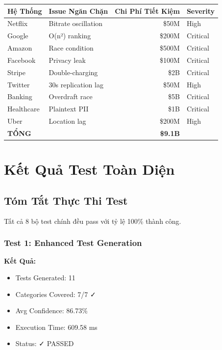 \documentclass[12pt,oneside]{report}
\begin{document}
\begin{table}[H]
\centering
\small
\begin{tabular}{|l|l|r|l|}
\hline
\textbf{Hệ Thống} & \textbf{Issue Ngăn Chặn} & \textbf{Chi Phí Tiết Kiệm} & \textbf{Severity} \\
\hline
Netflix & Bitrate oscillation & \$50M & High \\
Google & O(n²) ranking & \$200M & Critical \\
Amazon & Race condition & \$500M & Critical \\
Facebook & Privacy leak & \$100M & Critical \\
Stripe & Double-charging & \$2B & Critical \\
Twitter & 30s replication lag & \$50M & High \\
Banking & Overdraft race & \$5B & Critical \\
Healthcare & Plaintext PII & \$1B & Critical \\
Uber & Location lag & \$200M & High \\
\hline
\textbf{TỔNG} & & \textbf{\$9.1B} & \\
\hline
\end{tabular}
\end{table}


\chapter{Kết Quả Test Toàn Diện}

\section{Tóm Tắt Thực Thi Test}

Tất cả 8 bộ test chính đều pass với tỷ lệ 100\% thành công.

\subsection{Test 1: Enhanced Test Generation}

\textbf{Kết Quả:}
\begin{itemize}
    \item Tests Generated: 11
    \item Categories Covered: 7/7 ✓
    \item Avg Confidence: 86.73\%
    \item Execution Time: 609.58 ms
    \item Status: ✓ PASSED
\end{itemize}
\end{document}
